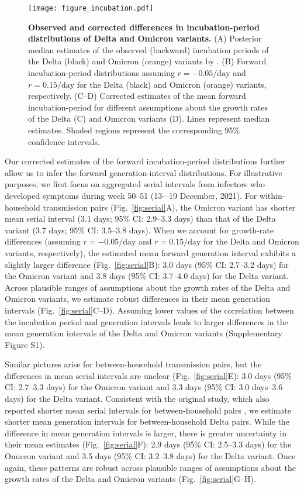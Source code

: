 \documentclass[12pt]{article}
\newcommand{\fref}[1]{Fig.~\ref{fig:#1}}
\begin{document}
\begin{figure}[!th]
\texttt{[image: figure\_incubation.pdf]}
\caption{
\textbf{Observed and corrected differences in incubation-period distributions of Delta and Omicron variants.}
(A) Posterior median estimates of the observed (backward) incubation periods of the Delta (black) and Omicron (orange) variants by \cite{backer2021omicron}.
(B) Forward incubation-period distributions assuming $r=-0.05/\mathrm{day}$ and $r=0.15/\mathrm{day}$ for the Delta (black) and Omicron (orange) variants, respectively.
(C--D) Corrected estimates of the mean forward incubation-period for different assumptions about the growth rates of the Delta (C) and Omicron variants (D).
Lines represent median estimates.
Shaded regions represent the corresponding 95\% confidence intervals.
\label{fig:incubation}
}
\end{figure}

Our corrected estimates of the forward incubation-period distributions further allow us to infer the forward generation-interval distributions.
For illustrative purposes, we first focus on aggregated serial intervals from infectors who developed symptoms during week 50--51 (13-–19 December, 2021).
For within-household transmission pairs (\fref{serial}A), the Omicron variant has shorter mean serial interval (3.1 days; 95\% CI: 2.9--3.3 days) than that of the Delta variant (3.7 days; 95\% CI: 3.5--3.8 days).
When we account for growth-rate differences (assuming $r=-0.05/\mathrm{day}$ and $r=0.15/\mathrm{day}$ for the Delta and Omicron variants, respectively), the estimated mean forward generation interval exhibits a slightly larger difference (\fref{serial}B):
3.0 days (95\% CI: 2.7--3.2 days) for the Omicron variant and 3.8 days (95\% CI: 3.7--4.0 days) for the Delta variant.
Across plausible ranges of assumptions about the growth rates of the Delta and Omicron variants, we estimate robust differences in their mean generation intervals (\fref{serial}C--D).
Assuming lower values of the correlation between the incubation period and generation intervals leads to larger differences in the mean generation intervals of the Delta and Omicron variants (Supplementary Figure S1).

Similar pictures arise for between-household transmission pairs, but the differences in mean serial intervals are unclear (\fref{serial}E): 3.0 days (95\% CI: 2.7--3.3 days) for the Omicron variant and 3.3 days (95\% CI: 3.0 days--3.6 days) for the Delta variant.
Consistent with the original study, which also reported shorter mean serial intervals for between-household pairs \citep{backer2021omicron}, we estimate shorter mean generation intervals for between-household Delta pairs.
While the difference in mean generation intervals is larger, there is greater uncertainty in their mean estimates (\fref{serial}F): 2.9 days (95\% CI: 2.5--3.3 days) for the Omicron variant and 3.5 days (95\% CI: 3.2--3.8 days) for the Delta variant.
Once again, these patterns are robust across plausible ranges of assumptions about the growth rates of the Delta and Omicron variants (\fref{serial}G--H).
\end{document}
